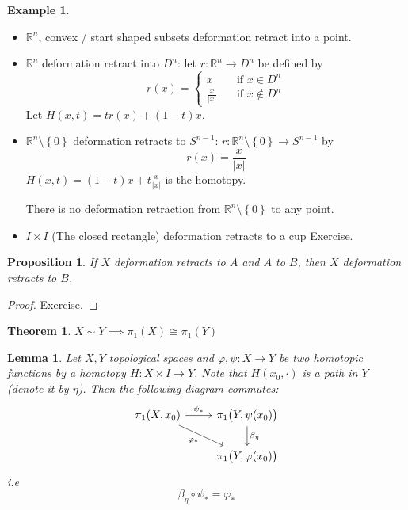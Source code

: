 \documentclass[11pt,a4paper]{article}
\theoremstyle{definition}
\newtheorem{example}[definition]{Example}
\theoremstyle{plain}
\newtheorem{theorem}[definition]{Theorem}
\newtheorem{lemma}[definition]{Lemma}
\newtheorem{proposition}[definition]{Proposition}
\theoremstyle{remark}
\newcommand{\R}{\mathbb{R}}
\renewcommand{\set}[1]{\left\{ #1 \right\}}
\newcommand{\1}{\mathbbm{1}}
\begin{document}
\begin{example}
    \begin{itemize}
        \item $\R^n$, convex / start shaped subsets deformation retract into a point. 
        \item $\R^n$ deformation retract into $D^n$: let $r \colon \R^n \to D^n$ be defined by 
        $$r(x) = \begin{cases}
            x \quad &\text{if } x \in D^n \\
            \frac{x}{|x|} \quad &\text{if } x \not\in D^n
        \end{cases}$$
        Let $H(x, t) = t r(x) + (1-t)x$. 
        \item $\R^n \setminus \set{0}$ deformation retracts to $S^{n-1}$: $r \colon \R^n \setminus \set{0} \to S^{n-1}$ by 
        $$r(x)  = \frac{x}{|x|}$$
        $H(x,t) = (1-t) x + t \frac{x}{|x|}$ is the homotopy. 

        There is no deformation retraction from $\R^n \setminus \set{0}$ to any point.

        \item $I \times I$ (The closed rectangle) deformation retracts to a cup Exercise. 
    \end{itemize}
\end{example}

\begin{proposition}
    If $X$ deformation retracts to $A$ and $A$ to $B$, then $X$ deformation retracts to $B$.
\end{proposition}

\begin{proof}
    Exercise.
\end{proof}

\begin{theorem}
    $X \sim Y \implies \pi_1(X) \cong \pi_1(Y)$ 
\end{theorem}

\begin{lemma}
    Let $X, Y$ topological spaces and $\varphi, \psi \colon X \to Y$ be two homotopic functions by a homotopy $H \colon X \times I \to Y$. 
    Note that $H(x_0, \cdot)$ is a path in $Y$ (denote it by $\eta$). Then the following diagram commutes:
    \[
    \begin{tikzcd}
    \pi_1(X,x_0) \arrow[r,"\psi_*"] \arrow[dr,swap,"\varphi_*"] &
    \pi_1\bigl(Y,\psi(x_0)\bigr) \arrow[d,"\beta_\eta"] \\
    & \pi_1\bigl(Y,\varphi(x_0)\bigr) 
    \end{tikzcd}
    \]
    i.e 
    $$\beta_\eta \circ \psi_* = \varphi_*$$ 
\end{lemma}
\end{document}
